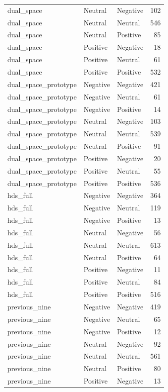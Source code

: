 \begin{tabular}{lllr}
dual\_space & Neutral & Negative & 102 \\
dual\_space & Neutral & Neutral & 546 \\
dual\_space & Neutral & Positive & 85 \\
dual\_space & Positive & Negative & 18 \\
dual\_space & Positive & Neutral & 61 \\
dual\_space & Positive & Positive & 532 \\
dual\_space\_prototype & Negative & Negative & 421 \\
dual\_space\_prototype & Negative & Neutral & 61 \\
dual\_space\_prototype & Negative & Positive & 14 \\
dual\_space\_prototype & Neutral & Negative & 103 \\
dual\_space\_prototype & Neutral & Neutral & 539 \\
dual\_space\_prototype & Neutral & Positive & 91 \\
dual\_space\_prototype & Positive & Negative & 20 \\
dual\_space\_prototype & Positive & Neutral & 55 \\
dual\_space\_prototype & Positive & Positive & 536 \\
hds\_full & Negative & Negative & 364 \\
hds\_full & Negative & Neutral & 119 \\
hds\_full & Negative & Positive & 13 \\
hds\_full & Neutral & Negative & 56 \\
hds\_full & Neutral & Neutral & 613 \\
hds\_full & Neutral & Positive & 64 \\
hds\_full & Positive & Negative & 11 \\
hds\_full & Positive & Neutral & 84 \\
hds\_full & Positive & Positive & 516 \\
previous\_nine & Negative & Negative & 419 \\
previous\_nine & Negative & Neutral & 65 \\
previous\_nine & Negative & Positive & 12 \\
previous\_nine & Neutral & Negative & 92 \\
previous\_nine & Neutral & Neutral & 561 \\
previous\_nine & Neutral & Positive & 80 \\
previous\_nine & Positive & Negative & 13 \\

\end{tabular}
